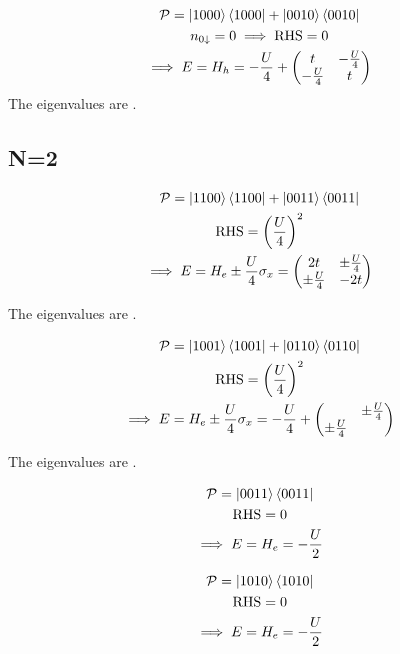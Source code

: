 \documentclass[12pt]{article}
\begin{document}
\begin{gather}
\mathcal{P} = \ket{1000}\bra{1000}+\ket{0010}\bra{0010}\\
n_{0\downarrow} = 0 \implies \text{RHS} = 0 \\
	\implies E = H_h = -\frac{U}{4} + \begin{pmatrix} t & -\frac{U}{4} \\ -\frac{U}{4} & t \end{pmatrix}
\end{gather}
The eigenvalues are .
\subsection{N=2}
\begin{gather}
	\mathcal{P} = \ket{1100}\bra{1100} + \ket{0011}\bra{0011}\\
	\text{RHS} = \left({\frac{U}{4}}\right)^2 \\
	\implies E = H_e \pm \frac{U}{4}\sigma_x = \begin{pmatrix} 2t & \pm\frac{U}{4} \\ \pm\frac{U}{4} & -2t \end{pmatrix} 
\end{gather}

The eigenvalues are .

\begin{gather}
	\mathcal{P} = \ket{1001}\bra{1001} + \ket{0110}\bra{0110}\\
	\text{RHS} = \left({\frac{U}{4}}\right)^2 \\
	\implies E = H_e \pm \frac{U}{4}\sigma_x = -\frac{U}{4}+{\begin{pmatrix} & \pm\frac{U}{4} \\ \pm\frac{U}{4} & \end{pmatrix}}
\end{gather}

The eigenvalues are .

\begin{gather}
	\mathcal{P} = \ket{0011}\bra{0011}\\
	\text{RHS} = 0 \\
	\implies E = H_e = -\frac{U}{2}
\end{gather}

\begin{gather}
	\mathcal{P} = \ket{1010}\bra{1010}\\
	\text{RHS} = 0 \\
	\implies E = H_e = -\frac{U}{2}
\end{gather}
\end{document}
